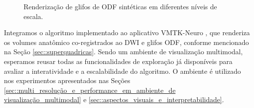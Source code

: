 \begin{figure}[ht]
     \caption{Renderização de glifos de ODF sintéticas em diferentes níveis de escala.}
    \label{fig::ambiente_validacao}
\end{figure}



Integramos o algoritmo implementado ao aplicativo VMTK-Neuro \cite{VMTKNeuro}, que renderiza os volumes anatômico co-registrados ao DWI e glifos ODF, conforme mencionado na Seção \ref{sec::superquadricas}. Sendo um ambiente de visualização multimodal, esperamos reusar todas as funcionalidades de exploração já disponíveis para avaliar a interatividade e a escalabilidade do algoritmo. O ambiente é utilizado nos experimentos apresentados nas Seções \ref{sec::multi_resolução_e_performance_em_ambiente_de visualização_multimodal} e \ref{sec::aspectos_visuais_e_interpretabilidade}.







